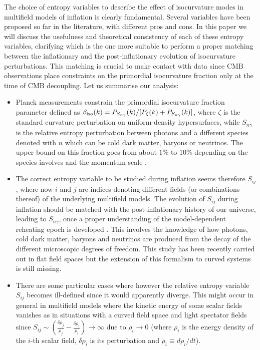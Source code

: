 \documentclass[a4paper,11pt]{article}
\begin{document}
The choice of entropy variables to describe the effect of isocurvature modes in multifield models of inflation is clearly fundamental. Several variables have been proposed so far in the literature, with different pros and cons. In this paper we will discuss the usefulness and theoretical consistency of each of these entropy variables, clarifying which is the one more suitable to perform a proper matching between the inflationary and the post-inflationary evolution of isocurvature perturbations. This matching is crucial to make contact with data since CMB observations place constraints on the primordial isocurvature fraction only at the time of CMB decoupling. Let us summarise our analysis:
\begin{itemize}
\item Planck measurements constrain the primordial isocurvature fraction parameter defined as $\beta_{\rm iso}(k) = P_{S_{n\gamma}}(k)/ [P_\zeta(k) + P_{S_{n\gamma}}(k)]$, where $\zeta$ is the standard curvature perturbation on uniform-density hypersurfaces, while $S_{n\gamma}$ is the relative entropy perturbation between photons and a different species denoted with $n$ which can be cold dark matter, baryons or neutrinos. The upper bound on this fraction goes from about $1\%$ to $10\%$ depending on the species involves and the momentum scale \cite{Akrami:2018odb}.

\item The correct entropy variable to be studied during inflation seems therefore $S_{ij}$, where now $i$ and $j$ are indices denoting different fields (or combinations thereof) of the underlying multifield models. The evolution of $S_{ij}$ during inflation should be matched with the post-inflationary history of our universe, leading to $S_{n\gamma}$, once a proper understanding of the model-dependent reheating epoch is developed \cite{Polarski:1994rz, Langlois:1999dw}. This involves the knowledge of how photons, cold dark matter, baryons and neutrinos are produced from the decay of the different microscopic degrees of freedom. This study has been recently carried out in flat field spaces \cite{Martin:2021frd} but the extension of this formalism to curved systems is still missing. 

\item There are some particular cases where however the relative entropy variable $S_{ij}$ becomes ill-defined since it would apparently diverge. This might occur in general in multifield models where the kinetic energy of some scalar fields vanishes \cite{Wands:2000dp} as in situations with a curved field space and light spectator fields \cite{Cicoli:2018ccr, Cicoli:2019ulk} since $S_{ij}\sim \left(\frac{\delta\rho_j}{\dot\rho_j} - \frac{\delta\rho_i}{\dot\rho_i}\right) \to \infty$ due to $\dot\rho_i\to 0$ (where $\rho_i$ is the energy density of the $i$-th scalar field, $\delta\rho_i$ is its perturbation and $\dot\rho_i \equiv d\rho_i/dt$).


\end{itemize}
\end{document}
